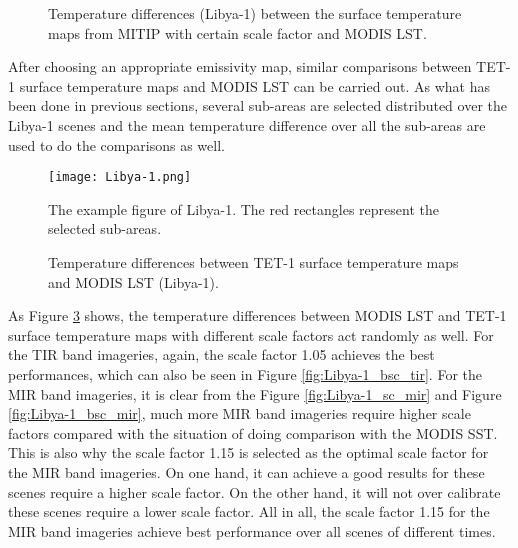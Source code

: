 \begin{figure}[!htbp]
\centering
{}
\hspace{0.5in}
\caption{Temperature differences (Libya-1) between the surface temperature maps from MITIP with certain scale factor and MODIS LST.}
\label{fig:diff_emi_Lybia2}
\end{figure}

\noindent After choosing an appropriate emissivity map, similar comparisons between TET-1 surface temperature maps and MODIS LST can be carried out. As what has been done in previous sections, several sub-areas are selected distributed over the Libya-1 scenes and the mean temperature difference over all the sub-areas are used to do the comparisons as well.\\

\begin{figure}[!htbp]
\centering
\texttt{[image: Libya-1.png]}
\caption{The example figure of Libya-1. The red rectangles represent the selected sub-areas.}
\label{fig:Libya1_sub_areas}
\end{figure}

\begin{figure}[!htbp]
\centering
{}
\hspace{0.5in}
\caption{Temperature differences between TET-1 surface temperature maps and MODIS LST (Libya-1).}
\label{fig:Libya-1_sc_mir_tir}
\end{figure}

\noindent As Figure \ref{fig:Libya-1_sc_mir_tir} shows, the temperature differences between MODIS LST and TET-1 surface temperature maps with different scale factors act randomly as well. For the TIR band imageries, again, the scale factor 1.05 achieves the best performances, which can also be seen in Figure \ref{fig:Libya-1_bsc_tir}. For the MIR band imageries, it is clear from the Figure \ref{fig:Libya-1_sc_mir} and Figure \ref{fig:Libya-1_bsc_mir}, much more MIR band imageries require higher scale factors compared with the situation of doing comparison with the MODIS SST. This is also why the scale factor 1.15 is selected as the optimal scale factor for the MIR band imageries. On one hand, it can achieve a good results for these scenes require a higher scale factor. On the other hand, it will not over calibrate these scenes require a lower scale factor. All in all, the scale factor 1.15 for the MIR band imageries achieve best performance over all scenes of different times.\\

